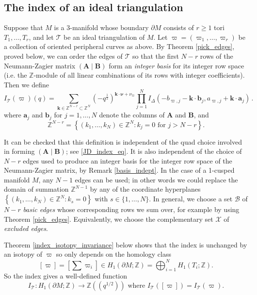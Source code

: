 \documentclass[12pt]{amsart}
\theoremstyle{definition}
\theoremstyle{remark}
\def\Z{\mathbb{Z}}
\def\tri{\mathcal{T}}
\def\kk{\boldsymbol{k}}
\def\bnu{\boldsymbol{\nu}}
\def\BZ{\mathbb Z}
\def\longto{\longrightarrow}
\def\pt{\partial}
\def\lbl{\label}
\newcommand{\CT}{\mathcal{T}}
\def\be{  \begin{equation} }
\def\ee{  \end{equation} }
\def\ID{I_{\Delta}}
\newcommand{\mb}{\mathbf}
\def\bd{\partial}
\begin{document}
\subsection{The index of an ideal triangulation}
\lbl{sub.defn.index}

Suppose that $M$ is a 3-manifold whose boundary $\bd M$ consists of $r \ge 1$ tori
$T_1, \ldots, T_r$, and let $\CT$ be an ideal triangulation of $M$.
 Let $\varpi=(\varpi_1, \ldots, \varpi_r)$ be a collection of oriented peripheral curves
as above. 
By Theorem \ref{pick_edges}, proved below, 
we can order the edges of $\tri$ so that the first $N-r$ rows of the Neumann-Zagier matrix $(\mb A \mid \mb B)$
form an {\em integer basis} for its integer row space (i.e. the $\Z$-module  of all linear combinations
of its rows with integer coefficients). Then we define
 \be
\lbl{eq.indT}
I_{\CT}(\varpi)(q)=\sum_{\kk \in \BZ^{N-r}\subset \Z^N}
(-q^{\frac{1}{2}})^{\kk \cdot \bnu  + \nu_{\varpi}} 
\prod_{j=1}^N \ID(-b_{\varpi,j} - \kk \cdot \boldsymbol{b}_j  , 
a_{\varpi,j} +\kk \cdot \boldsymbol{a}_j  ) \,.
\ee
where $\boldsymbol{a}_j$ and $\boldsymbol{b}_j$ for $j=1,\dots, N$ denote the columns of $\mb A$ and
$\mb B$, 
and $$\Z^{N-r} = \left\{  (k_1, \ldots, k_N) \in \Z^N : k_j=0 \text{ for } j > N-r \right\} .$$

It can be checked that this definition is independent of the quad choice involved in 
forming $(\mb A \mid \mb B)$; see \eqref{JD_index_eq}.  
It is also independent of the choice of $N-r$ edges used to produce an integer basis for the 
integer row space of the Neumann-Zagier matrix, by Remark \ref{basis_indept}.
In the case of a 1-cusped manifold $M$, any $N-1$ edges can be used; in other words we could replace the domain of summation $\Z^{N-1}$ by any of the coordinate hyperplanes   $\left\{ (k_1, \ldots, k_N) \in \Z^N : k_s=0 \right\}$ with $s \in \{1, \ldots, N \}$. In general, we choose a set $\mathcal B$ of $N-r$ \emph{basic edges} whose corresponding rows we sum over, for example by using Theorem \ref{pick_edges}. Equivalently, we choose the complementary set $\mathcal X$ of \emph{excluded edges}.
 
Theorem \ref{index_isotopy_invariance}
below shows that
the index is unchanged by an isotopy of $\varpi$ so only depends on the homology class
$$[\varpi]=\left[ \sum \varpi_i\right]  \in H_1(\bd M; \Z) = \bigoplus_{i=1}^N  H_1(T_i;\Z).$$  
So the index
gives a well-defined function
$$
I_{\CT}: H_1(\pt M;\BZ) \longto \BZ((q^{1/2})) \text{ where } I_{\CT}([\varpi])=I_{\CT}(\varpi).
$$
\end{document}
